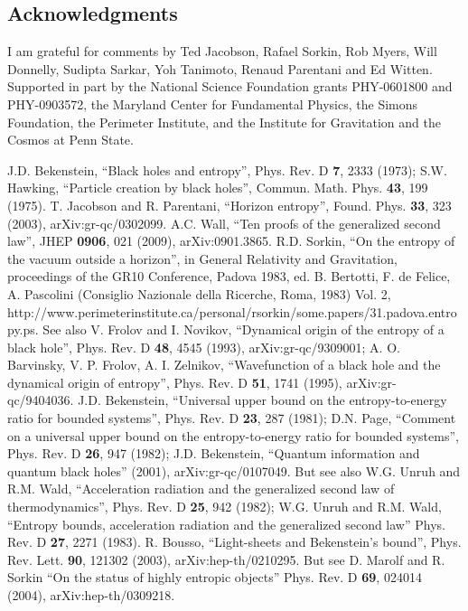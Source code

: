 \documentclass{article}
\begin{document}
\small
\subsection*{Acknowledgments}
I am grateful for comments by Ted Jacobson, Rafael Sorkin, Rob Myers, Will Donnelly, Sudipta Sarkar, Yoh Tanimoto, Renaud Parentani and Ed Witten.  Supported in part by the National Science Foundation grants PHY-0601800 and PHY-0903572, the Maryland Center for Fundamental Physics, the Simons Foundation, the Perimeter Institute, and the Institute for Gravitation and the Cosmos at Penn State.

\begin{thebibliography}{299}
J.D. Bekenstein, ``Black holes and entropy'', Phys. Rev. D \textbf{7}, 2333 (1973); S.W. Hawking, ``Particle creation by black holes'', Commun. Math. Phys. \textbf{43}, 199 (1975).
T. Jacobson and R. Parentani, ``Horizon entropy'', Found. Phys. \textbf{33}, 323 (2003), arXiv:gr-qc/0302099.
A.C. Wall, ``Ten proofs of the generalized second law'', JHEP \textbf{0906}, 021 (2009), arXiv:0901.3865.
R.D. Sorkin, ``On the entropy of the vacuum outside a horizon'', in General Relativity and Gravitation, proceedings of the GR10 Conference, Padova 1983, ed. B. Bertotti, F. de Felice,
A. Pascolini (Consiglio Nazionale della Ricerche, Roma, 1983) Vol. 2, \\
 http://www.perimeterinstitute.ca/personal/rsorkin/some.papers/31.padova.entropy.ps.
See also V. Frolov and I. Novikov, ``Dynamical origin of the entropy of a black hole'', Phys. Rev. D \textbf{48}, 4545 (1993), arXiv:gr-qc/9309001; A. O. Barvinsky, V. P. Frolov, A. I. Zelnikov, ``Wavefunction of a black hole and the dynamical origin of entropy'', Phys. Rev. D \textbf{51}, 1741 (1995), arXiv:gr-qc/9404036.
J.D. Bekenstein, ``Universal upper bound on the entropy-to-energy ratio for bounded systems'', Phys. Rev. D \textbf{23}, 287 (1981); D.N. Page, ``Comment on a universal upper bound on the entropy-to-energy ratio for bounded systems'', Phys. Rev. D \textbf{26}, 947 (1982); J.D. Bekenstein, ``Quantum information and quantum black holes'' (2001), arXiv:gr-qc/0107049.  But see also W.G. Unruh and R.M. Wald, ``Acceleration radiation and the generalized second law of thermodynamics'', Phys. Rev. D \textbf{25}, 942 (1982); W.G. Unruh and R.M. Wald, ``Entropy bounds, acceleration radiation and the generalized second law'' Phys. Rev. D \textbf{27}, 2271 (1983).
R. Bousso, ``Light-sheets and Bekenstein's bound'', Phys. Rev. Lett. \textbf{90}, 121302 (2003), arXiv:hep-th/0210295.  But see D. Marolf and R. Sorkin ``On the status of highly entropic objects'' Phys. Rev. D \textbf{69}, 024014 (2004), arXiv:hep-th/0309218.

\end{thebibliography}
\end{document}
